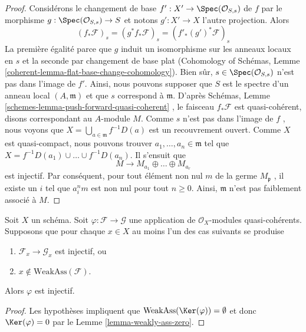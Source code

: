 \begin{proof}
Considérons le changement de base  $f' : X' \to \Spec(\mathcal{O}_{S, s})$  de  $f$  par le morphisme
 $g : \Spec(\mathcal{O}_{S, s}) \to S$  et notons  $g' : X' \to X$  l'autre projection. Alors
$$
(f_*\mathcal{F})_s = (g^*f_*\mathcal{F})_s = (f'_*(g')^*\mathcal{F})_s
$$
La première égalité parce que  $g$  induit un isomorphisme sur les anneaux
locaux en  $s$  et la seconde par changement de base plat (Cohomology of
Schémas, Lemme  \ref{coherent-lemma-flat-base-change-cohomology}). Bien sûr,  $s \in \Spec(\mathcal{O}_{S, s})$  n'est pas dans l'image de
 $f'$. Ainsi, nous pouvons supposer que  $S$  est le spectre d'un
anneau local  $(A, \mathfrak m)$  et que  $s$  correspond à  $\mathfrak m$. D'après
Schémas, Lemme  \ref{schemes-lemma-push-forward-quasi-coherent} , le faisceau  $f_*\mathcal{F}$  est quasi-cohérent, disons
correspondant au  $A$-module  $M$. Comme  $s$  n'est pas
dans l'image de  $f$ , nous voyons que  $X = \bigcup_{a \in \mathfrak m} f^{-1}D(a)$  est un recouvrement
ouvert. Comme  $X$  est quasi-compact, nous pouvons trouver  $a_1, \ldots, a_n \in \mathfrak m$ 
tel que  $X = f^{-1}D(a_1) \cup \ldots \cup f^{-1}D(a_n)$. Il s'ensuit que
$$
M \to M_{a_1} \oplus \ldots \oplus M_{a_r}
$$
est injectif. Par conséquent, pour tout élément non nul  $m$  de la germe
 $M_\mathfrak p$ , il existe un  $i$  tel que  $a_i^n m$  est non nul pour tout
 $n \geq 0$. Ainsi,  $\mathfrak m$  n'est pas faiblement associé à  $M$.
\end{proof}

\begin{lemma}
\label{lemma-check-injective-on-weakass}
Soit  $X$  un schéma. Soit  $\varphi : \mathcal{F} \to \mathcal{G}$  une application de
 $\mathcal{O}_X$-modules quasi-cohérents. Supposons que pour chaque  $x \in X$  au
moins l'un des cas suivants se produise
\begin{enumerate}
\item $\mathcal{F}_x \to \mathcal{G}_x$  est injectif, ou
\item $x \not \in \text{WeakAss}(\mathcal{F})$.
\end{enumerate}
Alors  $\varphi$  est injectif.
\end{lemma}

\begin{proof}
Les hypothèses impliquent que  $\text{WeakAss}(\Ker(\varphi)) = \emptyset$  et donc  $\Ker(\varphi) = 0$  par le Lemme
 \ref{lemma-weakly-ass-zero}.
\end{proof}

